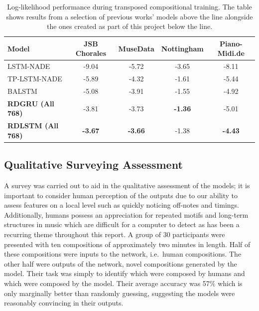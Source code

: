 \documentclass[12pt,]{article}
\begin{document}
\begin{table}[H]
\centering
\caption{Log-likelihood performance during transposed compositional training. The table shows results from a selection of previous works’ models above the line alongside the ones created as part of this project below the line.}
\vspace{1em}
\begin{tabular}{lcccc} 
\toprule
\textbf{Model}    & \textbf{JSB Chorales} & \textbf{MuseData} & \textbf{Nottingham} & \textbf{Piano-Midi.de}  \\ 
\midrule
LSTM-NADE         & -9.04                 & -5.72             & -3.65               & -8.11                   \\
TP-LSTM-NADE      & -5.89                 & -4.32             & -1.61               & -5.44                   \\
BALSTM            & -5.08                 & -3.91             & -1.55               & -4.92                   \\
\midrule
\textbf{RDGRU (All 768)}  & -3.81                 & -3.73             & \textbf{-1.36}      & -5.01                   \\
\textbf{RDLSTM (All 768)} & \textbf{-3.67}        & \textbf{-3.66}    & -1.38               & \textbf{-4.43}          \\
\bottomrule
\end{tabular}
\end{table}

\hypertarget{qualitative-surveying-assessment}{%
\subsection{Qualitative Surveying
Assessment}\label{qualitative-surveying-assessment}}

A survey was carried out to aid in the qualitative assessment of the
models; it is important to consider human perception of the outputs due
to our ability to assess features on a local level such as quickly
noticing off-notes and timings. Additionally, humans possess an
appreciation for repeated motifs and long-term structures in music which
are difficult for a computer to detect as has been a recurring theme
throughout this report. A group of 30 participants were presented with
ten compositions of approximately two minutes in length. Half of these
compositions were inputs to the network, i.e.~human compositions. The
other half were outputs of the network, novel compositions generated by
the model. Their task was simply to identify which were composed by
humans and which were composed by the model. Their average accuracy was
57\% which is only marginally better than randomly guessing, suggesting
the models were reasonably convincing in their outputs.
\end{document}
